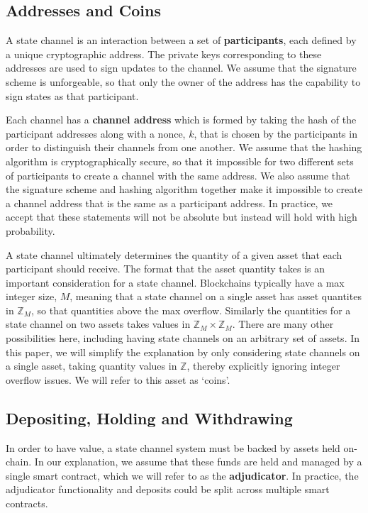 \documentclass{article}
\begin{document}
\subsection{Addresses and Coins}

A state channel is an interaction between a set of \textbf{participants}, each defined by a unique cryptographic address.
The private keys corresponding to these addresses are used to sign updates to the channel.
We assume that the signature scheme is unforgeable, so that only the owner of the address has the capability to sign states as that participant.

Each channel has a \textbf{channel address} which is formed by taking the hash of the participant addresses along with a nonce, $k$, that is chosen by the participants in order to distinguish their channels from one another.
We assume that the hashing algorithm is cryptographically secure, so that it impossible for two different sets of participants to create a channel with the same address.
We also assume that the signature scheme and hashing algorithm together make it impossible to create a channel address that is the same as a participant address.
In practice, we accept that these statements will not be absolute but instead will hold with high probability.

A state channel ultimately determines the quantity of a given asset that each participant should receive.
The format that the asset quantity takes is an important consideration for a state channel.
Blockchains typically have a max integer size, $M$, meaning that a state channel on a single asset
has asset quantites in $\mathbb{Z}_M$, so that quantities above the max overflow.
Similarly the quantities for a state channel on two assets takes values in $\mathbb{Z}_M \times \mathbb{Z}_M$.
There are many other possibilities here, including having state channels on an arbitrary set of assets.
In this paper, we will simplify the explanation by only considering state channels on a single
asset, taking quantity values in $\mathbb{Z}$, thereby explicitly ignoring integer overflow issues.
We will refer to this asset as `coins'.

\subsection{Depositing, Holding and Withdrawing}

In order to have value, a state channel system must be backed by assets held on-chain.
In our explanation, we assume that these funds are held and managed by a single smart contract,
which we will refer to as the \textbf{adjudicator}.
In practice, the adjudicator functionality and deposits could be split across multiple smart contracts.
\end{document}
